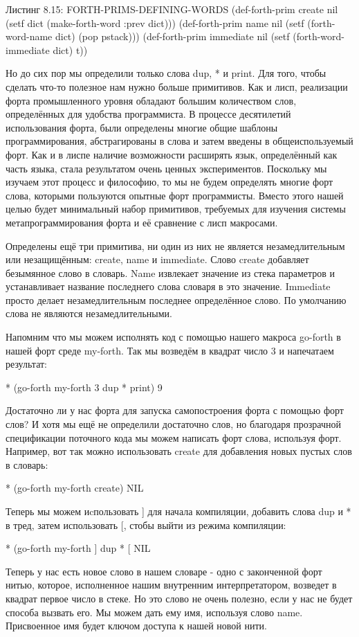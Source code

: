 Листинг 8.15: FORTH-PRIMS-DEFINING-WORDS
(def-forth-prim create nil
(setf dict (make-forth-word :prev dict)))
(def-forth-prim name nil
(setf (forth-word-name dict) (pop pstack)))
(def-forth-prim immediate nil
(setf (forth-word-immediate dict) t))

Но до сих пор мы определили только слова dup, * и print. Для того, чтобы сделать что-то полезное нам нужно больше примитивов. Как и лисп, реализации форта промышленного уровня обладают большим количеством слов, определённых для удобства программиста. В процессе десятилетий использования форта, были определены многие общие шаблоны программирования, абстрагированы в слова и затем введены в общеиспользуемый форт. Как и в лиспе наличие возможности расширять язык, определённый как часть языка, стала результатом очень ценных экспериментов. Поскольку мы изучаем этот процесс и философию, то мы не будем определять многие форт слова, которыми пользуются опытные форт программисты. Вместо этого нашей целью будет минимальный набор примитивов, требуемых для изучения системы метапрограммирования форта и её сравнение с лисп макросами.

Определены ещё три примитива, ни один из них не является незамедлительным или незащищённым: create, name и immediate. Слово create добавляет безымянное слово в словарь. Name извлекает значение из стека параметров и устанавливает название последнего слова словаря в это значение. Immediate просто делает незамедлительным последнее определённое слово. По умолчанию слова не являются незамедлительными.

Напомним что мы можем исполнять код с помощью нашего макроса go-forth в нашей форт среде my-forth. Так мы возведём в квадрат число 3 и напечатаем результат:

* (go-forth my-forth
3 dup * print)
9

Достаточно ли у нас форта для запуска самопостроения форта с помощью форт слов? И хотя мы ещё не определили достаточно слов, но благодаря прозрачной спецификации поточного кода мы можем написать форт слова, используя форт. Например, вот так можно использовать create для добавления новых пустых слов в словарь:

* (go-forth my-forth
create)
NIL

Теперь мы можем иcпользовать ] для начала компиляции, добавить слова dup и * в тред, затем использовать [, стобы выйти из режима компиляции:

* (go-forth my-forth
] dup * [
NIL

Теперь у нас есть новое слово в нашем словаре - одно с законченной форт нитью, которое, исполненное нашим внутренним интерпретатором, возведет в квадрат первое число в стеке. Но это слово не очень полезно, если у нас не будет способа вызвать его. Мы можем дать ему имя, используя слово name. Присвоенное имя будет ключом доступа к нашей новой нити.

